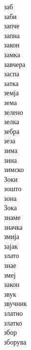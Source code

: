 \documentclass[a5paper,12pt]{article}
\newenvironment{activity}[1]{%
  \begin{tcolorbox}[colback=boxcolor,colframe=titlecolor,title={\textbf{#1}},fonttitle=\bfseries]
}{%
  \end{tcolorbox}
}
\begin{document}
\begin{activity}{Зборчиња}
\begin{multicols}{4}
заб\\ заби\\ запче\\ запна\\ закон\\ замка\\ завчера\\ заспа\\ затка\\ земја\\ зема\\ зелено\\ зелка\\ зебра\\ зеза\\ зима\\
зина\\ зимско\\ Зоки\\ зошто\\ зона\\ Зока\\ знаме\\ значка\\ змија\\ зајак\\ злато\\ знае\\ змеј\\ закон\\ звук\\ звучник\\ златно\\ златко\\ збор\\ зборува
\end{multicols}
\end{activity}
\end{document}

